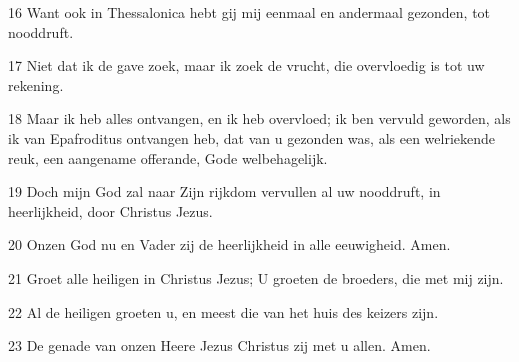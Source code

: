 \par 16 Want ook in Thessalonica hebt gij mij eenmaal en andermaal gezonden, tot nooddruft.
\par 17 Niet dat ik de gave zoek, maar ik zoek de vrucht, die overvloedig is tot uw rekening.
\par 18 Maar ik heb alles ontvangen, en ik heb overvloed; ik ben vervuld geworden, als ik van Epafroditus ontvangen heb, dat van u gezonden was, als een welriekende reuk, een aangename offerande, Gode welbehagelijk.
\par 19 Doch mijn God zal naar Zijn rijkdom vervullen al uw nooddruft, in heerlijkheid, door Christus Jezus.
\par 20 Onzen God nu en Vader zij de heerlijkheid in alle eeuwigheid. Amen.
\par 21 Groet alle heiligen in Christus Jezus; U groeten de broeders, die met mij zijn.
\par 22 Al de heiligen groeten u, en meest die van het huis des keizers zijn.
\par 23 De genade van onzen Heere Jezus Christus zij met u allen. Amen.



